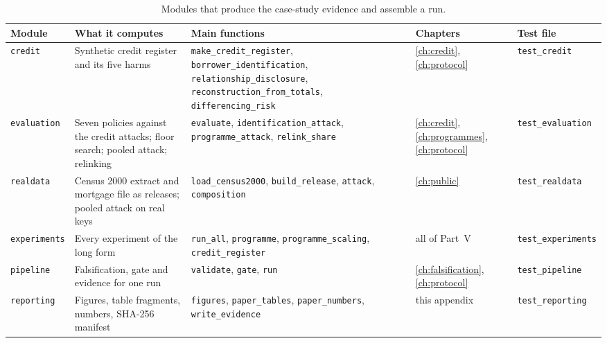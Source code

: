 \begin{table}[ht]
\centering
\caption{Modules that produce the case-study evidence and assemble a run.}
\label{app:tab-case}
\footnotesize
\setlength{\tabcolsep}{3pt}
\begin{tabular}{@{}>{\raggedright\arraybackslash}p{2.0cm}>{\raggedright\arraybackslash}p{3.6cm}>{\raggedright\arraybackslash}p{4.1cm}>{\raggedright\arraybackslash}p{1.8cm}>{\raggedright\arraybackslash}p{2.8cm}@{}}
\toprule
Module & What it computes & Main functions & Chapters & Test file \\
\midrule
\texttt{credit} & Synthetic credit register and its five harms &
\texttt{make\_\allowbreak{}credit\_\allowbreak{}register}, \texttt{borrower\_\allowbreak{}identification},
\texttt{relationship\_\allowbreak{}disclosure}, \texttt{reconstruction\_\allowbreak{}from\_\allowbreak{}totals},
\texttt{differencing\_\allowbreak{}risk} & \ref{ch:credit}, \ref{ch:protocol} &
\texttt{test\_\allowbreak{}credit} \\
\texttt{evaluation} & Seven policies against the credit attacks; floor search;
pooled attack; relinking & \texttt{evaluate}, \texttt{identification\_\allowbreak{}attack},
\texttt{programme\_\allowbreak{}attack}, \texttt{relink\_\allowbreak{}share} & \ref{ch:credit},
\ref{ch:programmes}, \ref{ch:protocol} & \texttt{test\_\allowbreak{}evaluation} \\
\texttt{realdata} & Census 2000 extract and mortgage file as releases; pooled attack
on real keys & \texttt{load\_\allowbreak{}census2000}, \texttt{build\_\allowbreak{}release}, \texttt{attack},
\texttt{composition} & \ref{ch:public} & \texttt{test\_\allowbreak{}realdata} \\
\texttt{experiments} & Every experiment of the long form & \texttt{run\_\allowbreak{}all},
\texttt{programme}, \texttt{programme\_\allowbreak{}scaling}, \texttt{credit\_\allowbreak{}register} & all of
Part~V & \texttt{test\_\allowbreak{}experiments} \\
\texttt{pipeline} & Falsification, gate and evidence for one run & \texttt{validate},
\texttt{gate}, \texttt{run} & \ref{ch:falsification}, \ref{ch:protocol} &
\texttt{test\_\allowbreak{}pipeline} \\
\texttt{reporting} & Figures, table fragments, numbers, SHA-256 manifest &
\texttt{figures}, \texttt{paper\_\allowbreak{}tables}, \texttt{paper\_\allowbreak{}numbers},
\texttt{write\_\allowbreak{}evidence} & this appendix & \texttt{test\_\allowbreak{}reporting} \\
\bottomrule
\end{tabular}
\end{table}


